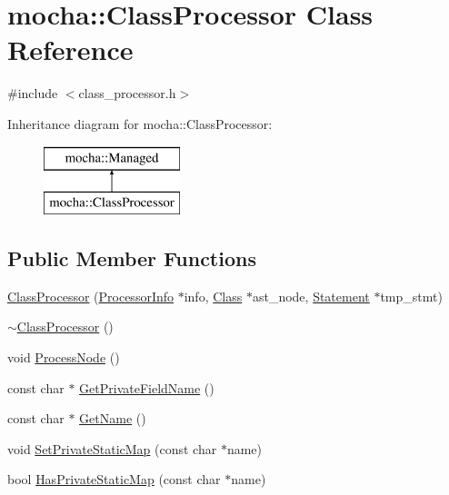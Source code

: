 \hypertarget{classmocha_1_1_class_processor}{
\section{mocha::ClassProcessor Class Reference}
\label{classmocha_1_1_class_processor}
}


{\ttfamily \#include $<$class\_\-processor.h$>$}

Inheritance diagram for mocha::ClassProcessor:\begin{figure}[H]
\begin{center}
\leavevmode
\includegraphics[height=2.000000cm]{classmocha_1_1_class_processor}
\end{center}
\end{figure}
\subsection*{Public Member Functions}
\begin{DoxyCompactItemize}
\item 
\hyperlink{classmocha_1_1_class_processor_a08d136f952bf8924f0937c36a8af840f}{ClassProcessor} (\hyperlink{classmocha_1_1_processor_info}{ProcessorInfo} $\ast$info, \hyperlink{classmocha_1_1_class}{Class} $\ast$ast\_\-node, \hyperlink{classmocha_1_1_statement}{Statement} $\ast$tmp\_\-stmt)
\item 
\hyperlink{classmocha_1_1_class_processor_a4bc98b761704a420e52fab5ff485acb6}{$\sim$ClassProcessor} ()
\item 
void \hyperlink{classmocha_1_1_class_processor_aa860cc22cd327b79d9c8aedb19c7667a}{ProcessNode} ()
\item 
const char $\ast$ \hyperlink{classmocha_1_1_class_processor_a05eea100d203a1c5f8a82c9136d8b0d8}{GetPrivateFieldName} ()
\item 
const char $\ast$ \hyperlink{classmocha_1_1_class_processor_a020054baa72f28b16513cfbd89cfd075}{GetName} ()
\item 
void \hyperlink{classmocha_1_1_class_processor_ab57d89a5787351ddba7941be4deee271}{SetPrivateStaticMap} (const char $\ast$name)
\item 
bool \hyperlink{classmocha_1_1_class_processor_a62ae94fe9fea168de267611684cf2954}{HasPrivateStaticMap} (const char $\ast$name)
\end{DoxyCompactItemize}
